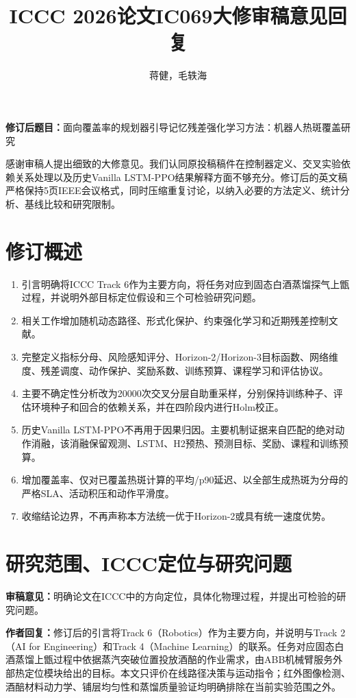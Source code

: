 \documentclass[UTF8,fontset=none]{ctexart}
\title{ICCC 2026论文IC069大修审稿意见回复}
\author{蒋健，毛轶海}
\date{}
\newcommand{\reviewcomment}[1]{\par\noindent\textbf{审稿意见：}#1\par}
\newcommand{\authorresponse}[1]{\par\noindent\textbf{作者回复：}#1\par}
\begin{document}
\maketitle

\noindent\textbf{修订后题目：}面向覆盖率的规划器引导记忆残差强化学习方法：机器人热斑覆盖研究

感谢审稿人提出细致的大修意见。我们认同原投稿稿件在控制器定义、交叉实验依赖关系处理以及历史Vanilla LSTM-PPO结果解释方面不够充分。修订后的英文稿严格保持5页IEEE会议格式，同时压缩重复讨论，以纳入必要的方法定义、统计分析、基线比较和研究限制。

\section{修订概述}
\begin{enumerate}
  \item 引言明确将ICCC Track 6作为主要方向，将任务对应到固态白酒蒸馏探气上甑过程，并说明外部目标定位假设和三个可检验研究问题。
  \item 相关工作增加随机动态路径、形式化保护、约束强化学习和近期残差控制文献。
  \item 完整定义指标分母、风险感知评分、Horizon-2/Horizon-3目标函数、网络维度、残差调度、动作保护、奖励系数、训练预算、课程学习和评估协议。
  \item 主要不确定性分析改为20000次交叉分层自助重采样，分别保持训练种子、评估环境种子和回合的依赖关系，并在四阶段内进行Holm校正。
  \item 历史Vanilla LSTM-PPO不再用于因果归因。主要机制证据来自匹配的绝对动作消融，该消融保留观测、LSTM、H2预热、预测目标、奖励、课程和训练预算。
  \item 增加覆盖率、仅对已覆盖热斑计算的平均/p90延迟、以全部生成热斑为分母的严格SLA、活动积压和动作平滑度。
  \item 收缩结论边界，不再声称本方法统一优于Horizon-2或具有统一速度优势。
\end{enumerate}

\section{研究范围、ICCC定位与研究问题}
\reviewcomment{明确论文在ICCC中的方向定位，具体化物理过程，并提出可检验的研究问题。}

\authorresponse{修订后的引言将Track 6（Robotics）作为主要方向，并说明与Track 2（AI for Engineering）和Track 4（Machine Learning）的联系。任务对应固态白酒蒸馏上甑过程中依据蒸汽突破位置投放酒醅的作业需求，由ABB机械臂服务外部热定位模块给出的目标。本文只评价在线路径决策与运动指令；红外图像检测、酒醅材料动力学、铺层均匀性和蒸馏质量验证均明确排除在当前实验范围之外。}
\end{document}
